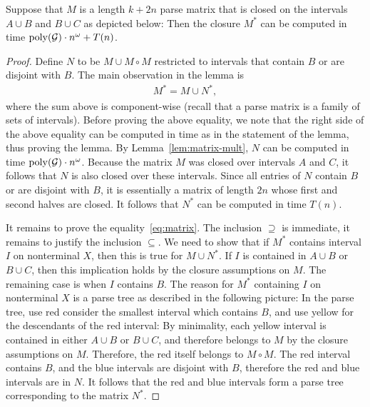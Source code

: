 \begin{lemma}\label{lem:overlap}
Suppose that $M$ is a length $k+2n$ parse matrix that is closed on the intervals $A \cup B$ and $B \cup C$ as depicted below: 
Then the closure $M^*$  can be computed in time 
 $ \mathrm{poly}(\mathcal{G})  \cdot n^\omega + T(n)$.
\end{lemma}
\begin{proof}  
Define $N$ to be $M \cup M \circ M$ restricted to intervals that contain $B$ or are disjoint with $B$. The main observation in the lemma is
 \begin{align}\label{eq:matrix}
  	M^* = M \cup N^*,
\end{align}
where the sum above is component-wise (recall that a parse matrix is a family of sets of intervals).
Before proving the above equality, we note that the right side of the above equality can be computed in time as in the statement of the lemma, thus proving the lemma.  By Lemma~\ref{lem:matrix-mult}, $N$ can be computed in time $\mathrm{poly}(\mathcal{G})  \cdot n^\omega$. Because the matrix $M$ was closed over intervals $A$ and $C$, it follows that $N$ is also closed over these intervals. Since all entries of $N$ contain $B$ or are disjoint with $B$, it is essentially a matrix of length $2n$ whose first and second halves are closed. It follows that $N^*$ can be computed in time $T(n)$. 

It remains to prove the equality~\eqref{eq:matrix}. The inclusion $\supseteq$ is immediate, it remains to justify the inclusion $\subseteq$.  
We need to show that if $M^*$ contains interval $I$ on nonterminal $X$, then this is true for $M \cup N^*$. If $I$ is contained in $A \cup B$ or $B \cup C$, then this implication holds by  the closure assumptions on $M$. The remaining case is when $I$ contains $B$. The reason for $M^*$ containing $I$ on nonterminal $X$  is  a parse tree as described in the following picture:
In the parse tree, use red consider the smallest interval which contains $B$, and use yellow for the descendants of the red interval:
By minimality, each yellow interval is contained in either  $A \cup B$ or  $B \cup C$, and therefore belongs to  $M$ by the closure assumptions on $M$.  Therefore, the red itself belongs to $M \circ M$. The red interval contains $B$, and the blue intervals are disjoint with $B$, therefore the red and blue intervals are in $N$. It follows that the red and blue intervals form a parse tree corresponding  to the matrix  $N^*$. 
\end{proof}


